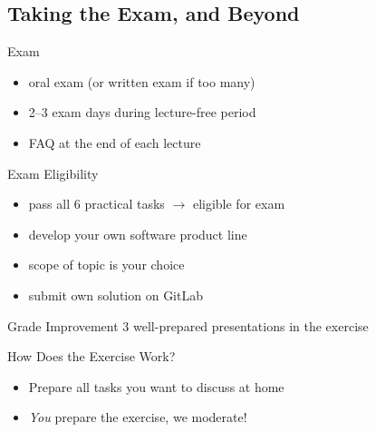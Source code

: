 

\subsection{Taking the Exam, and Beyond}

\begin{frame}[label=Exam]{\myframetitle}
	\begin{fancycolumns}
		\begin{definition}{Exam}
			\begin{itemize}
				\item oral exam (or written exam if too many) %
				\item 2--3 exam days during lecture-free period
				\item FAQ at the end of each lecture
			\end{itemize}
		\end{definition}
		\begin{definition}{Exam Eligibility } %
			\begin{itemize}
				\item pass all 6 practical tasks $\rightarrow$ eligible for exam
				\item develop your own software product line
				\item scope of topic is your choice
				\item submit own solution on GitLab
			\end{itemize}
		\end{definition}
		\begin{definition}{Grade Improvement } %
			3 well-prepared presentations in the exercise
		\end{definition}
	\nextcolumn
		

		\begin{note}{How Does the Exercise Work?}
			\begin{itemize}
				\item Prepare all tasks you want to discuss at home
				\item \emph{You} prepare the exercise, we moderate!
			\end{itemize}
		\end{note}


\end{fancycolumns}
\end{frame}
